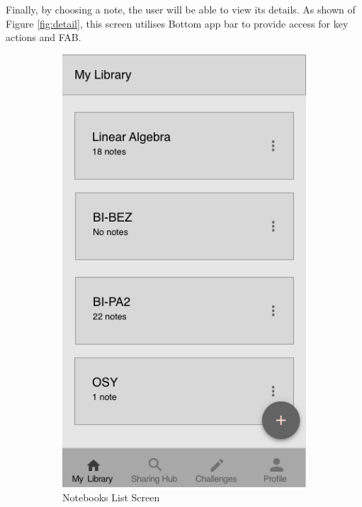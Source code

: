 \documentclass[thesis=B,english]{FITthesis}[2012/10/20]
\begin{document}
	Finally, by choosing a note, the user will be able to view its details. As shown of Figure \ref{fig:detail}, this screen utilises Bottom app bar to provide access for key actions and FAB.
	
\begin{figure}
\centering
\begin{subfigure}{.5\textwidth}
  \centering
  \includegraphics[scale=0.4]{Notebooks.png}
  \caption{Notebooks List Screen}
  \label{fig:notebooks}
\end{subfigure}%
\begin{subfigure}{.5\textwidth}
  \centering

\end{subfigure}
\end{figure}
\end{document}
